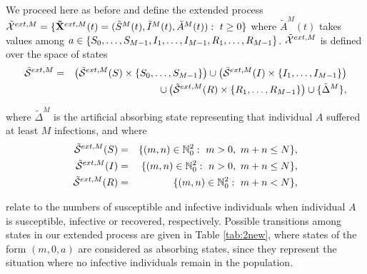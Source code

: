 \documentclass[preprint,12pt]{elsarticle}
\begin{document}
\vspace{0.5cm}

\par{}\\

\par We proceed here as before and define the extended process ${\cal \tilde X}^{ext,M}=\{{\bf \tilde X}^{ext,M}(t)=({\tilde S}^M(t),{\tilde I}^M(t),{\tilde A}^M(t)):\ t\geq0\}$ where
${\tilde A}^M(t)$ takes values among $a\in\{S_0,\dots,S_{M-1},I_1,\dots,I_{M-1},\linebreak R_1,\dots,R_{M-1}\}$. ${\cal \tilde X}^{ext,M}$ is defined over the
space of states
\begin{eqnarray*}
 {\cal \tilde S}^{ext,M} &=& \left({\cal \tilde S}^{ext,M}(S)\times\{S_0,\dots,S_{M-1}\}\right)\cup\left({\cal \tilde S}^{ext,M}(I)\times\{I_1,\dots,I_{M-1}\}\right)\\
 &&\cup\left({\cal \tilde S}^{ext,M}(R)\times\{R_1,\dots,R_{M-1}\}\right)\cup\{{\tilde \Delta}^M\},
\end{eqnarray*}
\par\noindent where ${\tilde \Delta}^M$ is the artificial absorbing state representing that individual $A$ suffered at least $M$ infections, and
where
\begin{eqnarray*}
 {\cal \tilde S}^{ext,M}(S) &=& \{(m,n)\in\mathbb{N}_0^2:\ m>0,\ m+n\leq N\},\\
{\cal \tilde S}^{ext,M}(I) &=& \{(m,n)\in\mathbb{N}_0^2:\ n>0,\ m+n\leq N\},\\
{\cal \tilde S}^{ext,M}(R) &=& \{(m,n)\in\mathbb{N}_0^2:\ m+n<N\},
\end{eqnarray*}

\par\noindent relate to the numbers of susceptible and infective individuals when individual $A$ is susceptible, infective or recovered, respectively.
Possible transitions among states in our extended process are given in Table \ref{tab:2new}, where states of the form $(m,0,a)$ are considered as
absorbing states, since they represent the situation where no infective individuals remain in the population.
\end{document}
